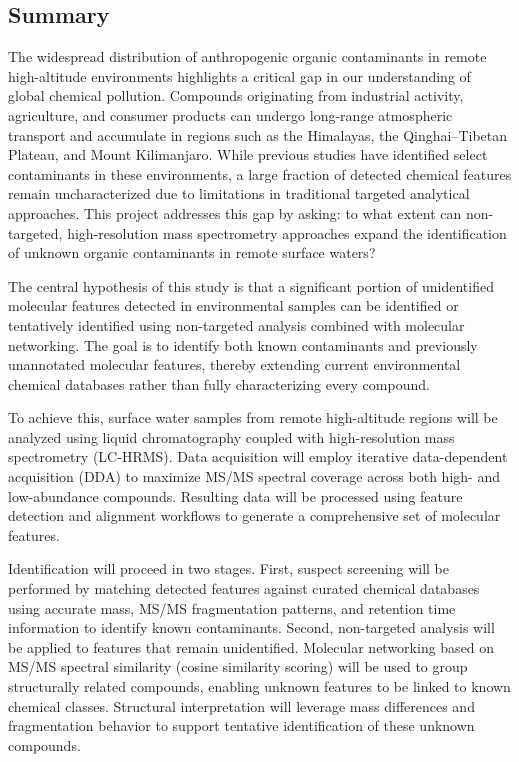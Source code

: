 \documentclass[11pt]{article}
\begin{document}
\begin{doublespace}
\newpage

\section{Summary}
    The widespread distribution of anthropogenic organic contaminants in remote high-altitude environments highlights a critical gap in our understanding of global chemical pollution.
    Compounds originating from industrial activity, agriculture, and consumer products can undergo long-range atmospheric transport and accumulate in regions such as the Himalayas, the Qinghai–Tibetan Plateau, and Mount Kilimanjaro.
    While previous studies have identified select contaminants in these environments, a large fraction of detected chemical features remain uncharacterized due to limitations in traditional targeted analytical approaches.
    This project addresses this gap by asking: to what extent can non-targeted, high-resolution mass spectrometry approaches expand the identification of unknown organic contaminants in remote surface waters?

    The central hypothesis of this study is that a significant portion of unidentified molecular features detected in environmental samples can be identified or tentatively identified using non-targeted analysis combined with molecular networking.
    The goal is to identify both known contaminants and previously unannotated molecular features, thereby extending current environmental chemical databases rather than fully characterizing every compound.

    To achieve this, surface water samples from remote high-altitude regions will be analyzed using liquid chromatography coupled with high-resolution mass spectrometry (LC-HRMS). Data acquisition will employ iterative data-dependent acquisition (DDA) to maximize MS/MS spectral coverage across both high- and low-abundance compounds.
    Resulting data will be processed using feature detection and alignment workflows to generate a comprehensive set of molecular features.

    Identification will proceed in two stages. First, suspect screening will be performed by matching detected features against curated chemical databases using accurate mass, MS/MS fragmentation patterns, and retention time information to identify known contaminants.
    Second, non-targeted analysis will be applied to features that remain unidentified. Molecular networking based on MS/MS spectral similarity (cosine similarity scoring) will be used to group structurally related compounds, enabling unknown features to be linked to known chemical classes.
    Structural interpretation will leverage mass differences and fragmentation behavior to support tentative identification of these unknown compounds.


\end{doublespace}
\end{document}
